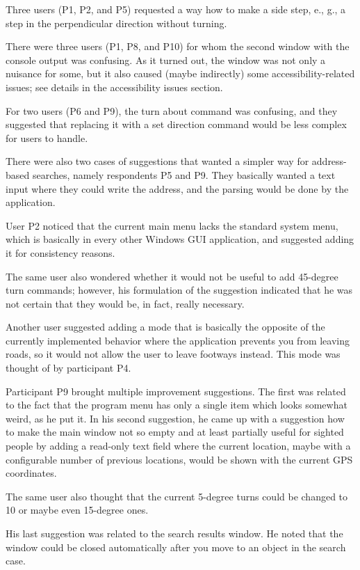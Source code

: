 \documentclass[nolof,digital]{fithesis3}
\begin{document}
Three users (P1, P2, and P5) requested a way how to make a side step, e., g., a step in the perpendicular direction without turning.

There were three users (P1, P8, and P10) for whom the second window with the console output was confusing. As it turned out, the window was not only a nuisance for some, but it also caused (maybe indirectly) some accessibility-related issues; see details in the accessibility issues section.

For two users (P6 and P9), the turn about command was confusing, and they suggested that replacing it with a set direction command would be less complex for users to handle.

There were also two cases of suggestions that wanted a simpler way for address-based searches, namely respondents P5 and P9. They basically wanted a text input where they could write the address, and the parsing would be done by the application.

User P2 noticed that the current main menu lacks the standard system menu, which is basically in every other Windows GUI application, and suggested adding it for consistency reasons.

The same user also wondered whether it would not be useful to add 45-degree turn commands; however, his formulation of the suggestion indicated that he was not certain that they would be, in fact, really necessary.

Another user suggested adding a mode that is basically the opposite of the currently implemented behavior where the application prevents you from leaving roads, so it would not allow the user to leave footways instead. This mode was thought of by participant P4.

Participant P9 brought multiple improvement suggestions. The first was related to the fact that the program menu has only a single item which looks somewhat weird, as he put it. In his second suggestion, he came up with a suggestion how to make the main window not so empty and at least partially useful for sighted people by adding a read-only text field where the current location, maybe with a configurable number of previous locations, would be shown with the current GPS coordinates.

The same user also thought that the current 5-degree turns could be changed to 10 or maybe even 15-degree ones.

His last suggestion was related to the search results window. He noted that the window could be closed automatically after you move to an object in the search case.
\end{document}

